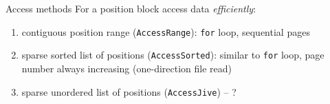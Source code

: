 \documentclass[compress, dvipsnames, unicode]{beamer}
\begin{document}
\begin{frame}{Access methods}
For a position block access data \textit{efficiently}:
\vspace{0.3em}

\begin{enumerate}
\setlength\itemsep{0.5em}
    \item contiguous position range (\texttt{AccessRange}): \texttt{for} loop, sequential pages
    \item sparse sorted list of positions (\texttt{AccessSorted}): similar to \texttt{for} loop, page number always increasing (one-direction file read)
    \item sparse unordered list of positions (\texttt{AccessJive}) -- ?
\end{enumerate}
\vspace{1.5em}

    
\begin{adjustbox}{max width=\textwidth}

\end{adjustbox}

\end{frame}

% 

\end{document}
